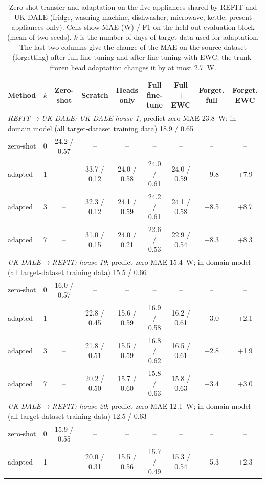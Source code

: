 \begin{table}[H]
\centering
\caption{Zero-shot transfer and adaptation on the five appliances shared by REFIT and UK-DALE (fridge, washing machine, dishwasher, microwave, kettle; present appliances only). Cells show MAE (W) / F1 on the held-out evaluation block (mean of two seeds). $k$ is the number of days of target data used for adaptation. The last two columns give the change of the MAE on the source dataset (forgetting) after full fine-tuning and after fine-tuning with EWC; the trunk-frozen head adaptation changes it by at most 2.7~W.}
\label{tab:transfer}
\footnotesize
\begin{tabular}{@{}lcccccccc@{}}
\toprule
Method & $k$ & Zero-shot & Scratch & Heads only & Full fine-tune & Full + EWC & Forget. full & Forget. EWC \\
\midrule
\multicolumn{9}{l}{\textit{REFIT$\rightarrow$UK-DALE: UK-DALE house 1}; predict-zero MAE 23.8~W; in-domain model (all target-dataset training data) 18.9 / 0.65} \\
zero-shot & 0 & 24.2 / 0.57 & -- & -- & -- & -- & -- & -- \\
adapted & 1 & -- & 33.7 / 0.12 & 24.0 / 0.58 & 24.0 / 0.61 & 24.0 / 0.59 & +9.8 & +7.9 \\
adapted & 3 & -- & 32.3 / 0.12 & 24.1 / 0.59 & 24.2 / 0.61 & 24.1 / 0.58 & +8.5 & +8.7 \\
adapted & 7 & -- & 31.0 / 0.15 & 24.0 / 0.21 & 22.6 / 0.53 & 22.9 / 0.54 & +8.3 & +8.3 \\
\midrule
\multicolumn{9}{l}{\textit{UK-DALE$\rightarrow$REFIT: house 19}; predict-zero MAE 15.4~W; in-domain model (all target-dataset training data) 15.5 / 0.66} \\
zero-shot & 0 & 16.0 / 0.57 & -- & -- & -- & -- & -- & -- \\
adapted & 1 & -- & 22.8 / 0.45 & 15.6 / 0.59 & 16.9 / 0.58 & 16.2 / 0.61 & +3.0 & +2.1 \\
adapted & 3 & -- & 21.8 / 0.51 & 15.5 / 0.59 & 16.8 / 0.62 & 16.5 / 0.61 & +2.8 & +1.9 \\
adapted & 7 & -- & 20.2 / 0.50 & 15.7 / 0.60 & 15.8 / 0.63 & 15.8 / 0.63 & +3.4 & +3.0 \\
\midrule
\multicolumn{9}{l}{\textit{UK-DALE$\rightarrow$REFIT: house 20}; predict-zero MAE 12.1~W; in-domain model (all target-dataset training data) 12.5 / 0.63} \\
zero-shot & 0 & 15.9 / 0.55 & -- & -- & -- & -- & -- & -- \\
adapted & 1 & -- & 20.0 / 0.31 & 15.5 / 0.56 & 15.7 / 0.49 & 15.3 / 0.54 & +5.3 & +2.3 \\

\end{tabular}
\end{table}
